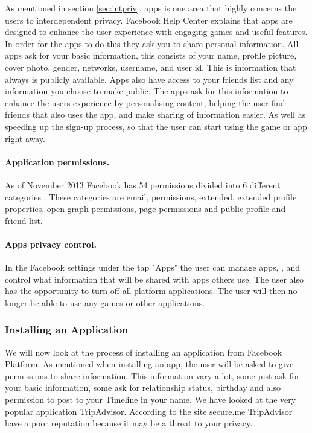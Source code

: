 As mentioned in section \ref{sec:intpriv}, apps is one area that highly concerns the users to interdependent privacy. Facebook Help Center \cite{faceHelp} explains that apps are designed to enhance the user experience with engaging games and useful features. In order for the apps to do this they ask you to share personal information. All apps ask for your basic information, this consists of your name, profile picture, cover photo, gender, networks, username, and user id. This is information that always is publicly available. Apps also have access to your friends list and any information you choose to make public. The apps ask for this information to enhance the users experience by personalising content, helping the user find friends that also uses the app, and make sharing of information easier. As well as speeding up the sign-up process, so that the user can start using the game or app right away. 

\paragraph{Application permissions.} As of November 2013 Facebook has 54 permissions divided into 6 different categories \cite{permission}. These categories are email, permissions, extended, extended profile properties, open graph permissions, page permissions and public profile and friend list. 

\paragraph{Apps privacy control.}In the Facebook settings \cite{facebooksettings} under the tap "Apps" the user can manage apps, , and control what information that will be shared with apps others use. The user also has the opportunity to turn off all platform applications. The user will then no longer be able to use any games or other applications.

\subsubsection{Installing an Application}
We will now look at the process of installing an application from Facebook Platform. As mentioned when installing an app, the user will be asked to give permissions to share information. This information vary a lot, some just ask for your basic information, some ask for relationship status, birthday and also permission to post to your Timeline in your name. We have looked at the very popular application TripAdvisor. According to the site secure.me \cite{secure.me} TripAdvisor have a poor reputation because it may be a threat to your privacy.  

